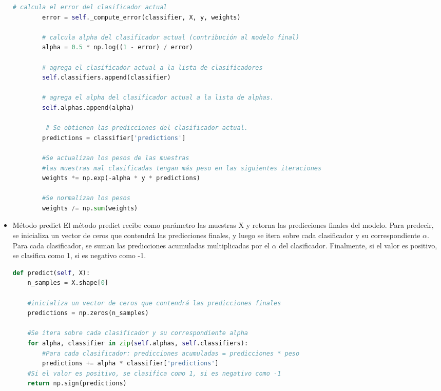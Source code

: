 \documentclass{article}
\begin{document}
\begin{itemize}
\begin{lstlisting}[language=Python, caption={train method}, label={lst:train_method}]
        # calcula el error del clasificador actual
        error = self._compute_error(classifier, X, y, weights)

        # calcula alpha del clasificador actual (contribución al modelo final)
        alpha = 0.5 * np.log((1 - error) / error)

        # agrega el clasificador actual a la lista de clasificadores
        self.classifiers.append(classifier)

        # agrega el alpha del clasificador actual a la lista de alphas.
        self.alphas.append(alpha)

         # Se obtienen las predicciones del clasificador actual.
        predictions = classifier['predictions']

        #Se actualizan los pesos de las muestras
        #las muestras mal clasificadas tengan más peso en las siguientes iteraciones
        weights *= np.exp(-alpha * y * predictions)

        #Se normalizan los pesos
        weights /= np.sum(weights)
        \end{lstlisting}

        \item Método predict
        \newline
        El método predict recibe como parámetro las muestras X y retorna las predicciones finales del modelo.
        Para predecir, se inicializa un vector de ceros que contendrá las predicciones finales, y luego
        se itera sobre cada clasificador y su correspondiente $\alpha$.
        Para cada clasificador, se suman las predicciones acumuladas multiplicadas por el $\alpha$ del clasificador.
        Finalmente, si el valor es positivo, se clasifica como 1, si es negativo como -1.

        \begin{lstlisting}[language=Python, caption={predict method}, label={lst:predict_method}]
def predict(self, X):
    n_samples = X.shape[0]

    #inicializa un vector de ceros que contendrá las predicciones finales
    predictions = np.zeros(n_samples)

    #Se itera sobre cada clasificador y su correspondiente alpha
    for alpha, classifier in zip(self.alphas, self.classifiers):
        #Para cada clasificador: predicciones acumuladas = predicciones * peso
        predictions += alpha * classifier['predictions']
    #Si el valor es positivo, se clasifica como 1, si es negativo como -1
    return np.sign(predictions)
        \end{lstlisting}


\end{itemize}
\end{document}
